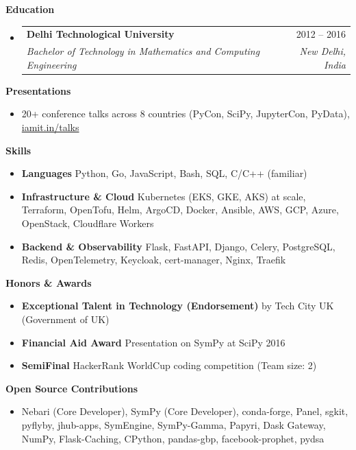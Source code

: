\documentclass[letterpaper,12pt]{article}[leftmargin=*]
\makeatletter
\def \entryspacing {-0pt}
\renewcommand{\section}[2]{\vspace{5pt}
  \colorbox{secondary}{\color{white}\raggedbottom\normalsize\textbf{{#1}{\hspace{7pt}#2}}}
}
\newcommand{\resumeEntryStart}{\begin{itemize}[leftmargin=2.5mm]}
\newcommand{\resumeEntryEnd}{\end{itemize}\vspace{\entryspacing}}
\newcommand{\resumeItem}[1]{
  \item{\small #1\par}\vspace{-2pt}
}
\newcommand{\resumeEntryTSDL}[4]{
  \vspace{-1pt}\item[]
    \begin{tabularx}{0.97\textwidth}{X@{\hspace{60pt}}r}
      \textbf{\color{primary}#1} & {\firabook\color{accent}\small#2} \\
      \textit{\color{accent}\small#3} & \textit{\color{accent}\small#4} \\
    \end{tabularx}\vspace{-6pt}
}
\newcommand{\resumeEntryS}[2]{
  \item[]\small{
    \textbf{\color{primary}#1 }{ #2 \vspace{-6pt}}
  }
}
\makeatother
\begin{document}
\section{\faGraduationCap}{Education}

  \resumeEntryStart
    \resumeEntryTSDL
      {Delhi Technological University}{2012 -- 2016}
      {Bachelor of Technology in Mathematics and Computing Engineering}{New Delhi, India}
  \resumeEntryEnd

\section{\faBullhorn}{Presentations}
 \resumeEntryStart
  \resumeEntryS{}{20+ conference talks across 8 countries (PyCon, SciPy, JupyterCon, PyData), \href{https://iamit.in/talks}{iamit.in/talks}}
 \resumeEntryEnd
\section{\faGears}{Skills}
 \resumeEntryStart
  \resumeEntryS{Languages}{Python, Go, JavaScript, Bash, SQL, C/C++ (familiar)}
  \resumeEntryS{Infrastructure \& Cloud}{Kubernetes (EKS, GKE, AKS) at scale, Terraform, OpenTofu, Helm, ArgoCD, Docker, Ansible, AWS, GCP, Azure, OpenStack, Cloudflare Workers}
  \resumeEntryS{Backend \& Observability}{Flask, FastAPI, Django, Celery, PostgreSQL, Redis, OpenTelemetry, Keycloak, cert-manager, Nginx, Traefik}
 \resumeEntryEnd

\section{\faTrophy}{Honors \& Awards}
 \resumeEntryStart
  \resumeEntryS{Exceptional Talent in Technology (Endorsement)} {by Tech City UK (Government of UK)}
  \resumeEntryS{Financial Aid Award}{Presentation on SymPy at SciPy 2016}
  \resumeEntryS{SemiFinal}{HackerRank WorldCup coding competition (Team size: 2)}
 \resumeEntryEnd

\section{\faChild}{Open Source Contributions}
 \resumeEntryStart
  \resumeItem{Nebari (Core Developer), SymPy (Core Developer), conda-forge, Panel, sgkit, pyflyby, jhub-apps, SymEngine, SymPy-Gamma, Papyri, Dask Gateway, NumPy, Flask-Caching, CPython, pandas-gbp, facebook-prophet, pydsa}
 \resumeEntryEnd
\end{document}
